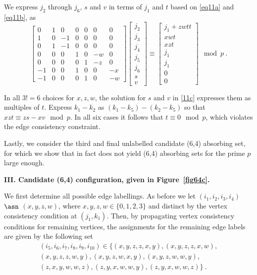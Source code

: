 {We express $j_2$ through $j_6$, $s$ and $v$ in terms of $j_1$ and
$t$ based on \eqref{eq11a} and \eqref{eq11b}, as
\begin{equation}\label{11c}
\left[ \begin{array}{ccccccc} 0 & 1 & 0 & 0 & 0 & 0 &0\\
1 & 0 & -1 & 0 & 0 & 0 &0\\
0 & 1 & -1 & 0 & 0 & 0 &0\\
0 & 0 & 0 & 1 & 0 & -w &0\\
0 & 0 & 0 & 0 & 1 & -z &0\\
-1 & 0 & 0 & 1 & 0 & 0 &-x\\
-1 & 0 & 0 & 0 & 1 & 0 &-w
\end{array}\right] \left[\begin{array}{c}
j_2\\j_3\\j_4\\j_5\\j_6\\s\\v\end{array}\right] \equiv
\left[\begin{array}{c}j_1+zwtt\\xwt\\xzt\\j_1\\j_1\\0\\0\end{array}\right]
\mod p~.
\end{equation}

In all $3!=6$ choices for $x,z,w$, the solution for $s$ and $v$ in
\eqref{11c} expresses them as multiples of $t$. Express $k_1-k_2$
as $(k_1-k_5)-(k_2-k_5)$ so that $xzt \equiv zs-xv \mod p$. In all
six cases it follows that $t \equiv 0 \mod p$, which violates the
edge consistency constraint.}

Lastly, we consider the third and final unlabelled candidate (6,4)
absorbing set, for which we show that in fact does not yield (6,4)
absorbing sets for the prime $p$ large enough.

\textbf{III. Candidate (6,4) configuration, given in
 Figure~\ref{fig64c}.}

 We first determine all possible edge labellings. As before we let
$(i_1,i_2,i_3,i_4)$ $\asn$ $(x,y,z,w)$, where $x,y,z,w \in
\{0,1,2,3 \}$ and distinct by the vertex consistency condition at
$(j_1,k_1)$. Then, by propagating vertex consistency conditions
for remaining vertices, the assignments for the remaining edge
labels are given by the following set
\begin{eqnarray*}\label{tuples3} (i_5,i_6,i_7,i_8,i_9,i_{10}) \in
 \{(x,y,z,z,x,y),(x,y,z,z,x,w),\\(x,y,z,z,w,y),(x,y,z,w,x,y),(x,y,z,w,w,y),\\(z,x,y,w,w,z), (z,y,x,w,w,y),(z,y,x,w,w,z)\}~.
\end{eqnarray*}

